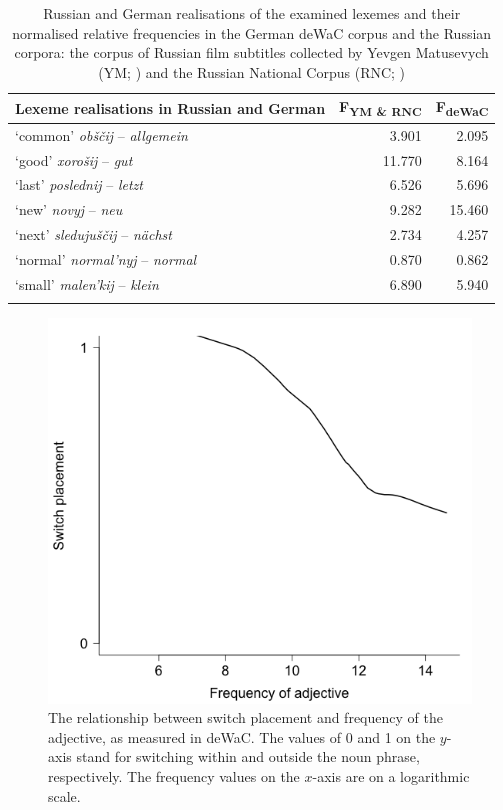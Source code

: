 \begin{table}
		\begin{tabular}{lrr}
			\lsptoprule
			Lexeme realisations in Russian and German & \multicolumn{1}{c}{F\textsubscript{YM \& RNC}} & \multicolumn{1}{c}{F\textsubscript{deWaC}} \\\midrule
			`common' \textit{obščij} -- \textit{allgemein}	&3.901	&2.095\\
			`good' \textit{xorošij} -- \textit{gut}	&11.770	&8.164\\
			`last' \textit{poslednij} -- \textit{letzt} 	&6.526	&5.696\\
			`new' \textit{novyj} -- \textit{neu}		&9.282	&15.460\\
			`next' \textit{sledujuščij} -- \textit{nächst} 	&2.734	&4.257\\
			`normal' \textit{normal'nyj} -- \textit{normal}	&0.870	&0.862\\
			`small' \textit{malen'kij} -- \textit{klein}	&6.890	&5.940\\
			\lspbottomrule
		\end{tabular}
\caption{Russian and German realisations of the examined lexemes and their normalised relative frequencies in the German deWaC corpus and the Russian corpora: the corpus of Russian film subtitles collected by Yevgen Matusevych (YM; \citealt{matusevych-etal}) and the Russian National Corpus (RNC; \citeyear{rnc})\label{tab:4:5}}
\end{table}

\begin{figure}
	\centering
    	\includegraphics[scale=0.5]{figures/4-Fr_A_DEWAC.png}
	\caption{The relationship between switch placement and frequency of the adjective, as measured in deWaC. The values of 0 and 1 on the $y$-axis stand for switching within and outside the noun phrase, respectively. The frequency values on the $x$-axis are on a logarithmic scale.\label{fig:4:adj_de}}
\end{figure}


